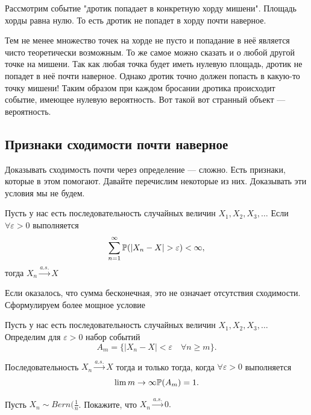 \documentclass[12pt, a4paper, oneside]{article}
\begin{document}
Рассмотрим событие "дротик попадает в конкретную хорду мишени". Площадь хорды равна нулю. То есть дротик не попадет в хорду почти наверное.

Тем не менее множество точек на хорде не пусто и попадание в неё является чисто теоретически возможным. То же самое можно сказать и о любой другой точке на мишени. Так как любая точка будет иметь нулевую площадь, дротик не попадет в неё почти наверное. Однако дротик точно должен попасть в какую-то точку мишени! Таким образом при каждом бросании дротика происходит событие, имеющее нулевую вероятность. Вот такой вот странный объект --- вероятность. 

\subsection{Признаки сходимости почти наверное}

Доказывать сходимость почти через определение --- сложно. Есть признаки, которые в этом помогают. Давайте перечислим некоторые из них. Доказывать эти условия мы не будем. 

\begin{theorem} 
Пусть у нас есть последовательность случайных величин $X_1, X_2, X_3, \ldots$ Если $\forall \varepsilon > 0$ выполняется  $$\sum_{n=1}^{\infty} \mathbb{P}(|X_n - X| > \varepsilon) < \infty, $$ тогда $X_n \overset{a.s.}{\to} X$
\end{theorem} 

Если оказалось, что сумма бесконечная, это не означает отсутствия сходимости. Сформулируем более мощное условие 

\begin{theorem} 
Пусть у нас есть последовательность случайных величин $X_1, X_2, X_3, \ldots$ Определим для $\varepsilon > 0$ набор событий $$A_m = \{|X_n - X| < \varepsilon  \quad \forall n \ge m\}.$$ 

Последовательность $X_n \overset{a.s.}{\to} X$ тогда и только тогда, когда $\forall \varepsilon > 0$  выполняется $$\lim{m \to \infty} \mathbb{P}(A_m) = 1.$$
\end{theorem} 

\begin{problem}{}
Пусть $X_n \sim Bern(\frac{1}{n}$. Покажите, что $X_n \overset{a.s.}{\to} 0.$
\end{problem} 
\end{document}
